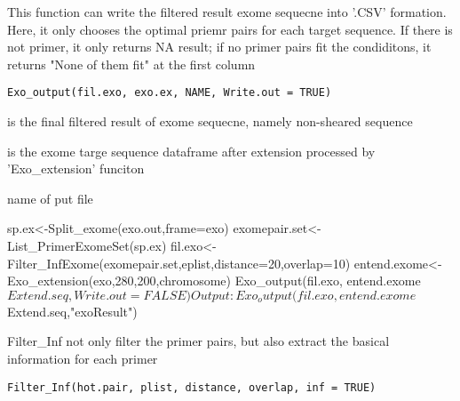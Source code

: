 \documentclass[a4paper]{book}
\begin{document}
%
\begin{Description}\relax
This function can write the filtered result exome sequecne into '.CSV' formation. Here, it only chooses the optimal
priemr pairs for each target sequence. If there is not primer, it only returns NA result; if  no
primer pairs fit the condiditons, it returns "None of them fit" at the first column
\end{Description}
%
\begin{Usage}
\begin{verbatim}
Exo_output(fil.exo, exo.ex, NAME, Write.out = TRUE)
\end{verbatim}
\end{Usage}
%
\begin{Arguments}
\begin{ldescription}
\item[\code{fil.exo}] is the final filtered result of exome sequecne, namely non-sheared sequence

\item[\code{exo.ex}] is the exome targe sequence dataframe after extension processed by
'Exo\_extension' funciton

\item[\code{NAME}] name of put file
\end{ldescription}
\end{Arguments}
%
\begin{Examples}
\begin{ExampleCode}
sp.ex<-Split_exome(exo.out,frame=exo)
exomepair.set<-List_PrimerExomeSet(sp.ex) %
fil.exo<-Filter_InfExome(exomepair.set,eplist,distance=20,overlap=10)
entend.exome<-Exo_extension(exo,280,200,chromosome)
Exo_output(fil.exo, entend.exome$Extend.seq,Write.out=FALSE)

Output:
Exo_output(fil.exo, entend.exome$Extend.seq,"exoResult")
\end{ExampleCode}
\end{Examples}
%
\begin{Description}\relax
Filter\_Inf not only filter the primer pairs, but also extract the basical information for each primer
\end{Description}
%
\begin{Usage}
\begin{verbatim}
Filter_Inf(hot.pair, plist, distance, overlap, inf = TRUE)
\end{verbatim}
\end{Usage}
\end{document}

